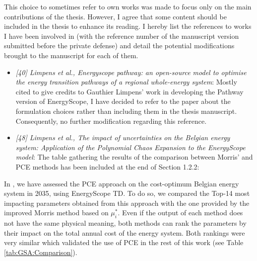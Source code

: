 \documentclass[12pt,a4paper]{article}
\begin{document}
\noindent This choice to sometimes refer to own works was made to focus only on the main contributions of the thesis. However, I agree that some content should be included in the thesis to enhance its reading. I hereby list the references to works I have been involved in (with the reference number of the manuscript version submitted before the private defense) and detail the potential modifications brought to the manuscript for each of them.

\begin{itemize}
\item \emph{[40] Limpens et al., Energyscope pathway: an open-source model to optimise the energy transition pathways of a regional whole-energy system}: Mostly cited to give credits to Gauthier Limpens' work in developing the Pathway version of EnergyScope, I have decided to refer to the paper about the formulation choices rather than including them in the thesis manuscript. Consequently, no further modification regarding this reference.
\item \emph{[48] Limpens et al., The impact of uncertainties on the Belgian energy system: Application of the Polynomial Chaos Expansion to the EnergyScope model}: The table gathering the results of the comparison between Morris' and PCE methods has been included {\color{blue}at the end of Section 1.2.2}:
\end{itemize} 

\begin{mdframed}[style=manuscript] %
In \cite{limpens2020impact}, we have assessed the PCE approach on the cost-optimum Belgian energy system in 2035, using EnergyScope TD. To do so, we compared the Top-14 most impacting parameters obtained from this approach with the one provided by the improved Morris method based on $\mu^*_{i}$. Even if the output of each method does not have the same physical meaning, both methods can rank the parameters by their impact on the total annual cost of the energy system. Both rankings were very similar which validated the use of PCE in the rest of this work (see Table \ref{tab:GSA:Comparison}).
\end{mdframed}
\end{document}
